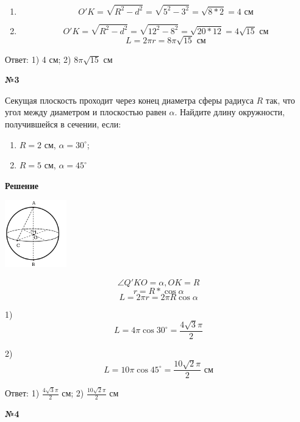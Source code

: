    \begin{enumerate}
        \item
        \[  O'K =  \sqrt{R ^ 2 - d ^ 2} = \sqrt{5 ^ 2 - 3 ^ 2} = \sqrt {8 * 2} = 4 \text{ см}\]

        \item
        \[  O'K =  \sqrt{R ^ 2 - d ^ 2} = \sqrt{12 ^ 2 - 8 ^ 2} = \sqrt {20 * 12} = 4\sqrt{15} \text{ см}\]
        \[ L = 2\pi r = 8 \pi \sqrt {15} \text{ см}\]
    \end{enumerate}

    Ответ: 1) 4 см; 2) $8 \pi \sqrt {15}$ см

    \begin{center}
        \textbf{№3}
    \end{center}

    Секущая плоскость проходит через конец диаметра сферы радиуса $R$ так,
    что угол между диаметром и плоскостью равен $\alpha$.
    Найдите длину окружности, получившейся в сечении, если:
    \begin{enumerate}
        \item $R = 2$ см, $\alpha = 30 ^{\circ}$;
        \item $R = 5$ см, $\alpha = 45 ^{\circ}$
    \end{enumerate}

    \textbf{Решение}\\

    \begin{center}
        \includegraphics[width=0.2\textwidth]{images/img2}\\
    \end{center}

    \[\angle Q'KO = \alpha , OK = R\]
    \[ r = R * \cos \alpha \]
    \[ L = 2\pi r = 2 \pi R  \cos \alpha \]

    1)
    \[ L = 4\pi \cos 30^{\circ} = \frac{4\sqrt {3}\pi}{2} \] 

    2)
    \[
        L = 10 \pi \cos 45^{\circ} = \frac{10\sqrt {2}\pi}{2} \text{ см}
    \]

    Ответ: 1) $\frac{4\sqrt {3}\pi}{2}$ см; 2) $\frac{10\sqrt {2}\pi}{2}$ см

    \begin{center}
        \textbf{№4}
    \end{center}

